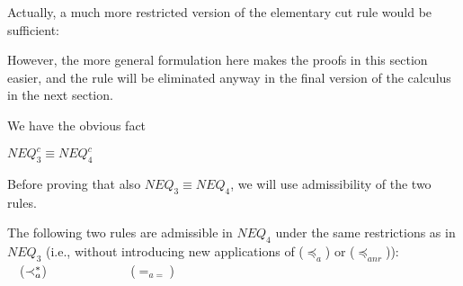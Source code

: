 \begin{REMARK}\label{re:cutx}
Actually, a much more restricted
version of the elementary cut rule would be sufficient: 
\begin{center}  \end{center}
However, the more general formulation here makes
the proofs in this section easier, and the rule will be eliminated anyway in the
final version of the calculus in the next section.
\end{REMARK}
%
We have the obvious fact
\begin{LEMMA}\label{le:neq3cisneq4c}
 $NEQ_3^c \equiv NEQ_4^c$
\end{LEMMA}
%
\noindent
Before proving that also $NEQ_3\equiv NEQ_4$, we will use admissibility of the 
two rules.
\begin{LEMMA}\label{le:asinNEQ3}
The following two rules are admissible in $NEQ_4$ under the same restrictions
as in $NEQ_3$ (i.e., without introducing new applications of ($\preceq_a$) or
($\preceq_{anr}$)): \\[1ex]
\hspace*{3em}
\ \ ($\mathbin{\prec}_a^*$) 
\ \ \ \ \ \ \ \ \ \ \ \ 
 ($=_{a=}$) \\[3ex]
\end{LEMMA}
